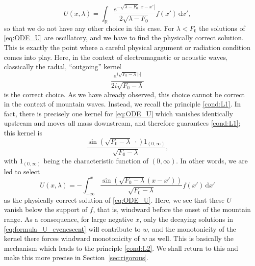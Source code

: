 \documentclass[11pt,twoside,reqno,centertags]{amsart}
\theoremstyle{definition}
\newcommand{\R}{\mathbb R}
\newcommand{\dd}{\mathrm d}
\begin{document}
\begin{equation}\label{eq:formula_U_evenescent}
	U(x,\lambda)=\int_\R\frac{e^{-\sqrt{\lambda-F_0}|x-x'|}}{2\sqrt{\lambda-F_0}}f(x')\,\dd x',
\end{equation}
so that we do not have any other choice in this case. For $\lambda<F_0$ the solutions of \eqref{eq:ODE_U} are oscillatory, and we have to find the physically correct solution. This is exactly the point where a careful physical argument or radiation condition comes into play. Here, in the context of electromagnetic or acoustic waves, classically the radial, \enquote{outgoing} kernel
\[\frac{e^{i\sqrt{F_0-\lambda}|\cdot|}}{2i\sqrt{F_0-\lambda}}\]
is the correct choice. As we have already observed, this choice cannot be correct in the context of mountain waves. Instead, we recall the principle \ref{cond:L1}. In fact, there is precisely one kernel for \eqref{eq:ODE_U} which vanishes identically upstream and moves all mass downstream, and therefore guarantees \ref{cond:L1}; this kernel is
\[\frac{\sin(\sqrt{F_0-\lambda}\;\cdot)1_{(0,\infty)}}{\sqrt{F_0-\lambda}},\]
with $1_{(0,\infty)}$ being the characteristic function of $(0,\infty)$. In other words, we are led to select
\[U(x,\lambda)=-\int_{-\infty}^x\frac{\sin(\sqrt{F_0-\lambda}(x-x'))}{\sqrt{F_0-\lambda}}f(x')\,\dd x'\]
as the physically correct solution of \eqref{eq:ODE_U}. Here, we see that these $U$ vanish below the support of $f$, that is, windward before the onset of the mountain range. As a consequence, for large negative $x$, only the decaying solutions in \eqref{eq:formula_U_evenescent} will contribute to $w$, and the monotonicity of the kernel there forces windward monotonicity of $w$ as well. This is basically the mechanism which leads to the principle \ref{cond:L2}. We shall return to this and make this more precise in Section~\ref{sec:rigorous}.
\end{document}
